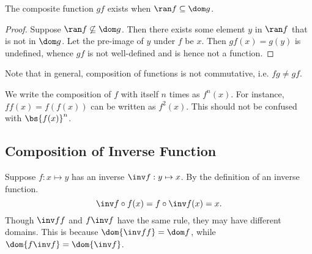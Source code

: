 \begin{proposition}
    The composite function $gf$ exists when $\ran f \subseteq \dom g$.
\end{proposition}
\begin{proof}
    Suppose $\ran f \not\subseteq \dom g$. Then there exists some element $y$ in $\ran f$ that is not in $\dom g$. Let the pre-image of $y$ under $f$ be $x$. Then $gf(x) = g(y)$ is undefined, whence $gf$ is not well-defined and is hence not a function.
\end{proof}

Note that in general, composition of functions is not commutative, i.e. $fg \neq gf$.

We write the composition of $f$ with itself $n$ times as $f^n(x)$. For instance, $ff(x) = f(f(x))$ can be written as $f^2(x)$. This should not be confused with $\bs{f(x)}^n$.

\subsection{Composition of Inverse Function}

Suppose $f : x \mapsto y$ has an inverse $\inv f : y \mapsto x$. By the definition of an inverse function. \[\inv f \circ f(x) = f \circ \inv f(x) = x.\] Though $\inv f f$ and $f \inv f$ have the same rule, they may have different domains. This is because $\dom {\inv f f} = \dom f$, while $\dom {f \inv f} = \dom {\inv f}$.